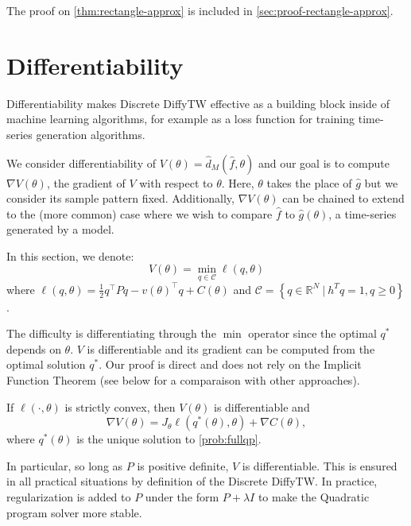 
The proof on \cref{thm:rectangle-approx} is included in \cref{sec:proof-rectangle-approx}.

\section{Differentiability}
Differentiability makes Discrete DiffyTW effective as a building block inside of machine learning algorithms, for example as a loss function for training time-series generation algorithms.

We consider differentiability of $V(\theta) = \hat d_M(\hat f, \theta)$ and our goal is to compute $\nabla V(\theta)$, the gradient of $V$ with respect to $\theta$. Here, $\theta$ takes the place of $\hat g$ but we consider its sample pattern fixed. Additionally, $\nabla V(\theta)$ can be chained to extend to the (more common) case where we wish to compare $\hat f$ to $\hat g(\theta)$, a time-series generated by a model.

In this section, we denote:
\begin{equation}\label{prob:fullqp}
    V(\theta) = \min_{q\in\mathcal C} \ell(q, \theta)
\end{equation}
where $\ell(q, \theta) = \frac{1}{2} q^\top Pq - v(\theta)^\top q + C(\theta)$ and $\mathcal C = \left\lbrace q\in\mathbb R^N ~\vert~ h^Tq=1, q \geq 0\right\rbrace$.

The difficulty is differentiating through the $\min$ operator since the optimal $q^*$ depends on $\theta$. $V$ is differentiable and its gradient can be computed from the optimal solution $q^*$. Our proof is direct and does not rely on the Implicit Function Theorem (see below for a comparaison with other approaches).

\begin{theorem}\label{thm:diffytw-grad}
    If $\ell(\cdot, \theta)$ is strictly convex, then $V(\theta)$ is differentiable and
    \begin{equation}
        \nabla V(\theta) = J_\theta \ell(q^*(\theta), \theta) + \nabla C(\theta),
    \end{equation} where $q^*(\theta)$ is the unique solution to \cref{prob:fullqp}.
\end{theorem}

In particular, so long as $P$ is positive definite, $V$ is differentiable. This is ensured in all practical situations by definition of the Discrete DiffyTW. In practice, regularization is added to $P$ under the form $P + \lambda I$ to make the Quadratic program solver more stable.


